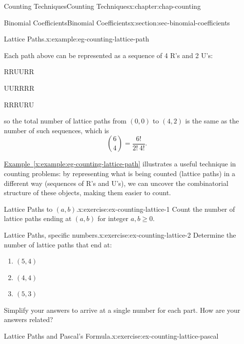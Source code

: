 \documentclass[oneside,10pt,]{book}
\newcommand{\xreffont}{\relax}
\numberwithin{equation}{section}
\begin{document}
\begin{chapterptx}{Counting Techniques}{}{Counting Techniques}{}{}{x:chapter:chap-counting}
\begin{sectionptx}{Binomial Coefficients}{}{Binomial Coefficients}{}{}{x:section:sec-binomial-coefficients}
\begin{example}{Lattice Paths.}{x:example:eg-counting-lattice-path}
\begin{sidebyside}{3}{0.0166666666666667}{0.0166666666666667}{0.0333333333333333}
\begin{sbspanel}{0.3}
{}%
\end{sbspanel}%
\end{sidebyside}%
\par
Each path above can be represented as a sequence of 4 R's and 2 U's:%
\begin{sidebyside}{3}{0.0916666666666667}{0.0916666666666667}{0.183333333333333}%
\begin{sbspanel}{0.15}%
RRUURR%
\end{sbspanel}%
\begin{sbspanel}{0.15}%
\par
UURRRR%
\end{sbspanel}%
\begin{sbspanel}{0.15}%
\par
RRRURU%
\end{sbspanel}%
\end{sidebyside}%
\par
so the total number of lattice paths from \((0,0)\) to \((4,2)\) is the same as the number of such sequences, which is%
\begin{equation*}
\binom{6}{4} = \frac{6!}{2! \ 4!}\text{.}
\end{equation*}
%
\end{example}
\hyperref[x:example:eg-counting-lattice-path]{Example~{\xreffont\ref{x:example:eg-counting-lattice-path}}} illustrates a useful technique in counting problems: by representing what is being counted (lattice paths) in a different way (sequences of R's and U's), we can uncover the combinatorial structure of these objects, making them easier to count.%
\begin{inlineexercise}{Lattice Paths to \((a,b)\).}{x:exercise:ex-counting-lattice-1}%
Count the number of lattice paths ending at \((a,b)\) for integer \(a,b \geq 0\).%
\end{inlineexercise}%
\begin{inlineexercise}{Lattice Paths, specific numbers.}{x:exercise:ex-counting-lattice-2}%
Determine the number of lattice paths that end at:%
\begin{enumerate}[label=(\alph*)]
\item{}\(\displaystyle (5,4)\)%
\item{}\(\displaystyle (4,4)\)%
\item{}\(\displaystyle (5,3)\)%
\end{enumerate}
Simplify your answers to arrive at a single number for each part. How are your answers related?%
\end{inlineexercise}%
\begin{inlineexercise}{Lattice Paths and Pascal's Formula.}{x:exercise:ex-counting-lattice-pascal}%

\end{inlineexercise}
\end{sectionptx}
\end{chapterptx}
\end{document}
